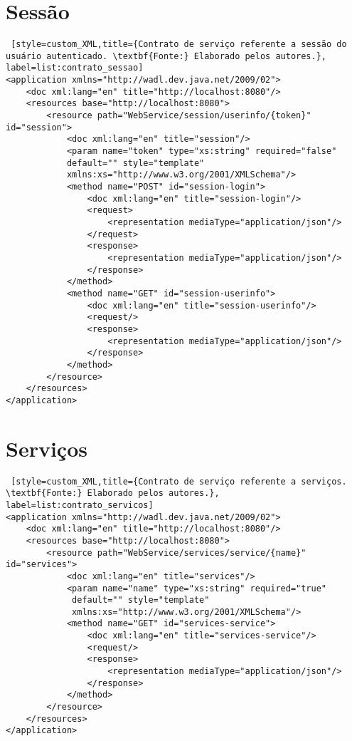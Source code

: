 \section*{Sessão}

\begin{lstlisting} [style=custom_XML,title={Contrato de serviço referente a sessão do usuário autenticado. \textbf{Fonte:} Elaborado pelos autores.}, label=list:contrato_sessao] 	
<application xmlns="http://wadl.dev.java.net/2009/02">
	<doc xml:lang="en" title="http://localhost:8080"/>
	<resources base="http://localhost:8080">
		<resource path="WebService/session/userinfo/{token}" id="session">
			<doc xml:lang="en" title="session"/>
			<param name="token" type="xs:string" required="false" 
			default="" style="template" 
			xmlns:xs="http://www.w3.org/2001/XMLSchema"/>
			<method name="POST" id="session-login">
				<doc xml:lang="en" title="session-login"/>
				<request>
					<representation mediaType="application/json"/>
				</request>
				<response>
					<representation mediaType="application/json"/>
				</response>
			</method>
			<method name="GET" id="session-userinfo">
				<doc xml:lang="en" title="session-userinfo"/>
				<request/>
				<response>
					<representation mediaType="application/json"/>
				</response>
			</method>
		</resource>
	</resources>
</application>
\end{lstlisting}

\section*{Serviços}

\begin{lstlisting} [style=custom_XML,title={Contrato de serviço referente a serviços. \textbf{Fonte:} Elaborado pelos autores.}, label=list:contrato_servicos] 	
<application xmlns="http://wadl.dev.java.net/2009/02">
	<doc xml:lang="en" title="http://localhost:8080"/>
	<resources base="http://localhost:8080">
		<resource path="WebService/services/service/{name}" id="services">
			<doc xml:lang="en" title="services"/>
			<param name="name" type="xs:string" required="true"
			 default="" style="template" 
			 xmlns:xs="http://www.w3.org/2001/XMLSchema"/>
			<method name="GET" id="services-service">
				<doc xml:lang="en" title="services-service"/>
				<request/>
				<response>
					<representation mediaType="application/json"/>
				</response>
			</method>
		</resource>
	</resources>
</application>
\end{lstlisting}

